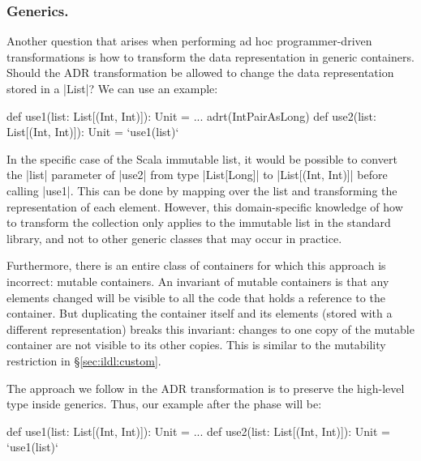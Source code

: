 \subsubsection{Generics.}
\label{sec:ildl:language-generics}
Another question that arises when performing ad hoc programmer-driven transformations is how to transform the data representation in generic containers. Should the ADR transformation be allowed to change the data representation stored in a |List|? We can use an example:

\begin{lstlisting-nobreak}
def use1(list: List[(Int, Int)]): Unit = ...
adrt(IntPairAsLong) {
  def use2(list: List[(Int, Int)]): Unit = `use1(list)`
}
\end{lstlisting-nobreak}

In the specific case of the Scala immutable list, it would be possible to convert the |list| parameter of |use2| from type |List[Long]| to |List[(Int, Int)]| before calling |use1|. This can be done by mapping over the list and transforming the representation of each element. However, this domain-specific knowledge of how to transform the collection only applies to the immutable list in the standard library, and not to other generic classes that may occur in practice.

Furthermore, there is an entire class of containers for which this approach is incorrect: mutable containers. An invariant of mutable containers is that any elements changed will be visible to all the code that holds a reference to the container. But duplicating the container itself and its elements (stored with a different representation) breaks this invariant: changes to one copy of the mutable container are not visible to its other copies. This is similar to the mutability restriction in \S\ref{sec:ildl:custom}.

The approach we follow in the ADR transformation is to preserve the high-level type inside generics. Thus, our example after the \commit{} phase will be:

\begin{lstlisting-nobreak}
def use1(list: List[(Int, Int)]): Unit = ...
def use2(list: List[(Int, Int)]): Unit = `use1(list)`
\end{lstlisting-nobreak}


